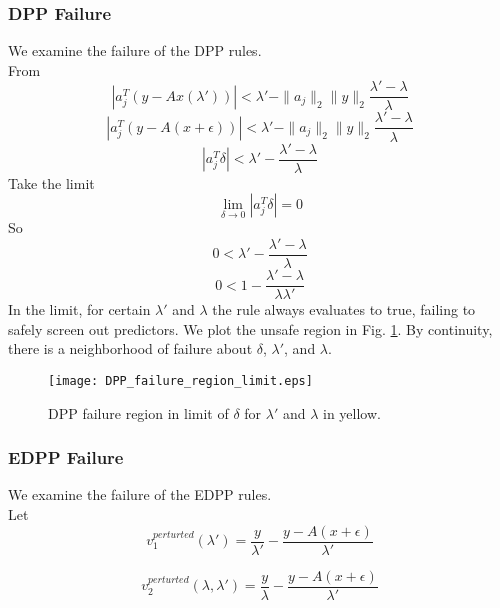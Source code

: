 \documentclass{article}
\begin{document}
\subsubsection*{DPP Failure}
We examine the failure of the DPP rules.\\
From
$$ |a_j^T (y - Ax(\lambda'))| < \lambda' - \|a_j\|_2 \|y\|_2 \frac{\lambda'-\lambda}{\lambda} $$
$$ |a_j^T (y - A(x+\epsilon))| < \lambda' - \|a_j\|_2 \|y\|_2 \frac{\lambda'-\lambda}{\lambda} $$
$$ |a_j^T \delta| < \lambda' - \frac{\lambda'-\lambda}{\lambda} $$
Take the limit
$$ \lim_{\delta \rightarrow 0} |a_j^T \delta| = 0$$
So
$$ 0 < \lambda' - \frac{\lambda'-\lambda}{\lambda} $$
$$ 0 < 1 - \frac{\lambda'-\lambda}{\lambda\lambda'} $$
In the limit, for certain $\lambda'$ and $\lambda$ the rule always evaluates to true, failing to safely screen out predictors. We plot the unsafe region in Fig. \ref{fig:DPP_failure_region_limit}. By continuity, there is a neighborhood of failure about $\delta$, $\lambda'$, and $\lambda$.

\begin{figure}
    \centering
    {\texttt{[image: DPP\_failure\_region\_limit.eps]} }
    \caption{DPP failure region in limit of $\delta$ for $\lambda'$ and $\lambda$ in yellow.}
	\label{fig:DPP_failure_region_limit}
\end{figure}


\subsubsection*{EDPP Failure}

We examine the failure of the EDPP rules.\\
Let
$$
v_1^{perturted}(\lambda') = \frac{y}{\lambda'} - \frac{y-A(x+\epsilon)}{\lambda'}
$$

$$
v_2^{perturted}(\lambda,\lambda') = \frac{y}{\lambda} - \frac{y-A(x+\epsilon)}{\lambda'}
$$
\end{document}
